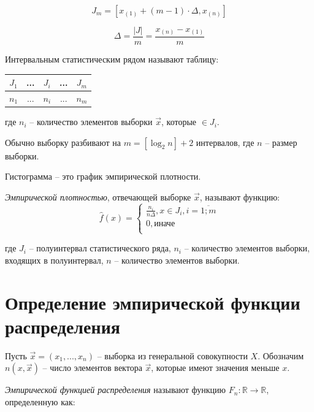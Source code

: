 \documentclass[12pt]{report}
\begin{document}
\begin{equation*}
	J_{m} = [x_{(1)} + (m - 1) \cdot \Delta, x_{(n)}]
\end{equation*}

\begin{equation*}
	\Delta = \frac{|J|}{m} = \frac{x_{(n)} - x_{(1)}}{m}
\end{equation*}

Интервальным статистическим рядом называют таблицу:

\begin{table}[htb]
	\centering
	\begin{tabular}{|c|c|c|c|c|}
		\hline
		$J_1$ & ... & $J_i$ & ... & $J_m$ \\
		\hline
		$n_1$ & ... & $n_i$ & ... & $n_m$ \\
		\hline
	\end{tabular}
\end{table}

где $n_i$ -- количество элементов выборки $\vec x$, которые $\in J_i$.

Обычно выборку разбивают на $m=[\log_2n]+2$ интервалов, где $n$ -- размер выборки.

Гистограмма -- это график эмпирической плотности. 

\textit{Эмпирической плотностью}, отвечающей выборке $\vec x$, называют функцию:
\begin{equation}
	\hat f(x) =
	\begin{cases}
		\frac{n_i}{n \Delta}, x \in J_i, i = \overline{1; m} \\
		0, \text{иначе} \\
	\end{cases}
\end{equation}

где $J_i$ -- полуинтервал статистического ряда, $n_i$ -- количество элементов выборки, входящих в полуинтервал, $n$ -- количество элементов выборки.

\section*{Определение эмпирической функции распределения}

Пусть $\vec x = (x_1, ..., x_n)$ -- выборка из генеральной совокупности $X$. Обозначим $n(x, \vec x)$ -- число элементов вектора $\vec x$, которые имеют значения меньше $x$.

\textit{Эмпирической функцией распределения} называют функцию $F_n: \mathbb{R} \to \mathbb{R}$, определенную как: 
\end{document}

